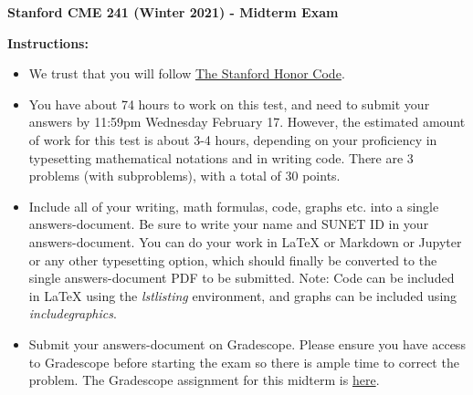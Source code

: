 \documentclass[12pt]{exam}
\begin{document}
\begin{center}
{\large {\bf Stanford CME 241 (Winter 2021) - Midterm Exam}}
\end{center}
{\large{\bf Instructions:}}
\begin{itemize}
\item We trust that you will follow \href{https://communitystandards.stanford.edu/policies-and-guidance/honor-code}{The Stanford Honor Code}.
\item You have about 74 hours to work on this test, and need to submit your answers by 11:59pm Wednesday February 17. However, the estimated amount of work for this test is about 3-4 hours, depending on your proficiency in typesetting mathematical notations and in writing code. There are 3 problems (with subproblems), with a total of 30 points.
\item Include all of your writing, math formulas, code, graphs etc. into a single answers-document. Be sure to write your name and SUNET ID in your answers-document. You can do your work in LaTeX or Markdown or Jupyter or any other typesetting option, which should finally be converted to the single answers-document PDF to be submitted. Note: Code can be included in LaTeX using the {\em lstlisting} environment, and graphs can be included using {\em includegraphics}.
\item Submit your answers-document on Gradescope. Please ensure you have access to Gradescope before starting the exam so there is ample time to correct the problem. The Gradescope assignment for this midterm is  \href{https://www.gradescope.com/courses/245396}{here}.
\end{itemize}
 
\end{document}
